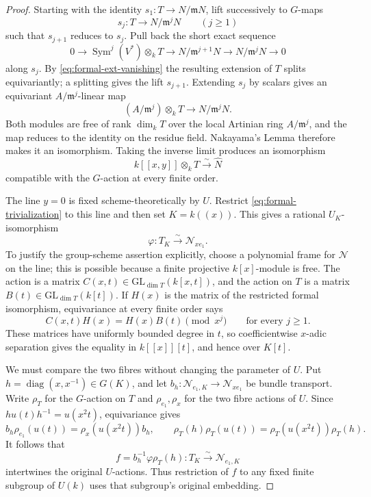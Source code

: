 \begin{proof}
Starting with the identity $s_1:T\to N/\mathfrak mN$, lift successively to
$G$-maps
\[
 s_j:T\longrightarrow N/\mathfrak m^jN\qquad(j\geq1)
\]
such that $s_{j+1}$ reduces to $s_j$.  Pull back the short exact sequence
\[
 0\longrightarrow \operatorname{Sym}^j(V^*)\otimes_k T
 \longrightarrow N/\mathfrak m^{j+1}N
 \longrightarrow N/\mathfrak m^jN\longrightarrow0
\]
along $s_j$.  By \eqref{eq:formal-ext-vanishing} the resulting extension
of $T$ splits equivariantly; a splitting gives the lift $s_{j+1}$.
Extending $s_j$ by scalars gives an equivariant
$A/\mathfrak m^j$-linear map
\[
 (A/\mathfrak m^j)\otimes_k T\longrightarrow N/\mathfrak m^jN.
\]
Both modules are free of rank $\dim_kT$ over the local Artinian ring
$A/\mathfrak m^j$, and the map reduces to the identity on the residue
field.  Nakayama's Lemma therefore makes it an isomorphism.  Taking the
inverse limit produces an isomorphism
\begin{equation}
 \label{eq:formal-trivialization}
 k[[x,y]]\otimes_kT\xrightarrow{\sim}\widehat N
\end{equation}
compatible with the $G$-action at every finite order.

The line $y=0$ is fixed scheme-theoretically by $U$.  Restrict
\eqref{eq:formal-trivialization} to this line and then set $K=k((x))$.
This gives a rational $U_K$-isomorphism
\[
 \varphi:T_K\xrightarrow{\sim}\mathcal N_{xe_1}.
\]
To justify the group-scheme assertion explicitly, choose a polynomial
frame for $\mathcal N$ on the line; this is possible because a finite
projective $k[x]$-module is free.  The action is a matrix
$C(x,t)\in\mathrm{GL}_{\dim T}(k[x,t])$, and the action on $T$ is a
matrix $B(t)\in\mathrm{GL}_{\dim T}(k[t])$.  If $H(x)$ is the matrix of
the restricted formal isomorphism, equivariance at every finite order
says
\[
 C(x,t)H(x)=H(x)B(t)\pmod{x^j}
 \qquad\text{for every }j\geq1.
\]
These matrices have uniformly bounded degree in $t$, so coefficientwise
$x$-adic separation gives the equality in $k[[x]][t]$, and hence over
$K[t]$.

We must compare the two fibres without changing the parameter of $U$.
Put $h=\operatorname{diag}(x,x^{-1})\in G(K)$, and let
$b_h:\mathcal N_{e_1,K}\to\mathcal N_{xe_1}$ be bundle transport.
Write $\rho_T$ for the $G$-action on $T$ and $\rho_{e_1},\rho_x$ for
the two fibre actions of $U$.  Since
$h u(t)h^{-1}=u(x^2t)$, equivariance gives
\[
 b_h\rho_{e_1}(u(t))=\rho_x(u(x^2t))b_h,
 \qquad
 \rho_T(h)\rho_T(u(t))=\rho_T(u(x^2t))\rho_T(h).
\]
It follows that
\begin{equation}
 \label{eq:cancel-torus-conjugation}
 f=b_h^{-1}\varphi\rho_T(h):T_K\xrightarrow{\sim}\mathcal N_{e_1,K}
\end{equation}
intertwines the original $U$-actions.  Thus restriction of $f$ to any
fixed finite subgroup of $U(k)$ uses that subgroup's original embedding.


\end{proof}

